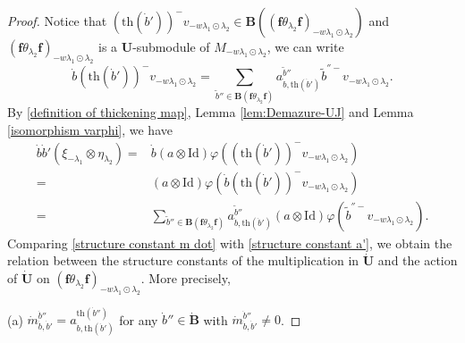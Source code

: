 \documentclass[10pt,a4paper]{amsart}
\begin{document}
\begin{proof}
Notice that $(\mathrm{th}(\dot{b}'))^-v_{-w\lambda_1\odot\lambda_2}\in \mathbf{B}((\mathbf{f}\theta_{\lambda_2}\mathbf{f})_{-w\lambda_1\odot\lambda_2})$ and $(\mathbf{f}\theta_{\lambda_2}\mathbf{f})_{-w\lambda_1\odot\lambda_2}$ is a $\mathbf{U}$-submodule of $M_{-w\lambda_1\odot\lambda_2}$, we can write 
\begin{equation}\label{structure constant a}
\dot{b}(\mathrm{th}(\dot{b}'))^-v_{-w\lambda_1\odot\lambda_2}=\sum_{\tilde{b}''\in \mathbf{B}(\mathbf{f}\theta_{\lambda_2}\mathbf{f})} a_{\dot{b},\mathrm{th}(\dot{b}')}^{\tilde{b}''}\tilde{b}^{''-}v_{-w\lambda_1\odot\lambda_2}.  
\end{equation}
By \eqref{definition of thickening map}, Lemma \ref{lem:Demazure-UJ} and Lemma \ref{isomorphism varphi}, we have 
\begin{equation}\label{structure constant a'}
\begin{aligned}
\dot{b}\dot{b}'(\xi_{-\lambda_1}\otimes \eta_{\lambda_2})=&\dot{b}(a\otimes \mathrm{Id})\varphi((\mathrm{th}(\dot{b}'))^-v_{-w\lambda_1\odot\lambda_2})\\
=&(a\otimes \mathrm{Id})\varphi(\dot{b}(\mathrm{th}(\dot{b}'))^-v_{-w\lambda_1\odot\lambda_2})\\
=&\sum_{\tilde{b}''\in \mathbf{B}(\mathbf{f}\theta_{\lambda_2}\mathbf{f})}a_{\dot{b},\mathrm{th}(\dot{b}')}^{\tilde{b}''}(a\otimes \mathrm{Id})\varphi(\tilde{b}^{''-}v_{-w\lambda_1\odot\lambda_2}).   
\end{aligned}
\end{equation}
Comparing \eqref{structure constant m dot} with \eqref{structure constant a'}, we obtain the relation between the structure constants of the multiplication in $\dot{\mathbf{U}}$ and the action of $\dot{\mathbf{U}}$ on $(\mathbf{f}\theta_{\lambda_2}\mathbf{f})_{-w\lambda_1\odot\lambda_2}$. More precisely,

(a) $\dot{m}_{\dot{b},\dot{b}'}^{\dot{b}''}=a_{\dot{b},\mathrm{th}(\dot{b}')}^{\mathrm{th}(\dot{b}'')}$ for any $\dot{b}'' \in \dot{\mathbf{B}}$ with $\dot{m}_{\dot{b},\dot{b}'}^{\dot{b}''}\not=0$.


\end{proof}
\end{document}
